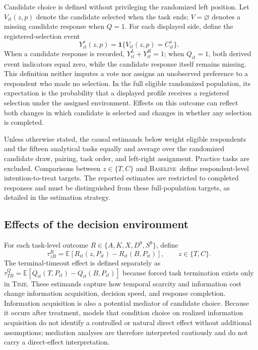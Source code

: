\documentclass[11pt]{article}\usepackage[]{graphicx}\usepackage[]{xcolor}
\newcommand{\armT}{\textsc{Time}}
\newcommand{\armB}{\textsc{Baseline}}
\newcommand{\E}{\mathbb{E}}
\begin{document}
Candidate choice is defined without privileging the randomized left position. Let $V_{it}(z,p)$ denote the candidate selected when the task ends; $V=\varnothing$ denotes a missing candidate response when $Q=1$. For each displayed side, define the registered-selection event
\[
Y^s_{it}(z,p)=\mathbf 1\{V_{it}(z,p)=C^s_{it}\}.
\]
When a candidate response is recorded, $Y^L_{it}+Y^R_{it}=1$; when $Q_{it}=1$, both derived event indicators equal zero, while the candidate response itself remains missing. This definition neither imputes a vote nor assigns an unobserved preference to a respondent who made no selection. In the full eligible randomized population, its expectation is the probability that a displayed profile receives a registered selection under the assigned environment. Effects on this outcome can reflect both changes in which candidate is selected and changes in whether any selection is completed.

Unless otherwise stated, the causal estimands below weight eligible respondents and the fifteen analytical tasks equally and average over the randomized candidate draw, pairing, task order, and left-right assignment. Practice tasks are excluded. Comparisons between $z\in\{T,C\}$ and \armB\ define respondent-level intention-to-treat targets. The reported estimates are restricted to completed responses and must be distinguished from these full-population targets, as detailed in the estimation strategy.

\subsection{Effects of the decision environment}

For each task-level outcome $R\in\{A,K,X,D^{9},S^{9}\}$, define
\[
\tau^R_{zB}=\E\!\left[R_{it}(z,P_{it})-R_{it}(B,P_{it})\right],
\qquad z\in\{T,C\}.
\]
The terminal-timeout effect is defined separately as $\tau^Q_{TB}=\E[Q_{it}(T,P_{it})-Q_{it}(B,P_{it})]$ because forced task termination exists only in \armT. These estimands capture how temporal scarcity and information cost change information acquisition, decision speed, and response completion. Information acquisition is also a potential mediator of candidate choice. Because it occurs after treatment, models that condition choice on realized information acquisition do not identify a controlled or natural direct effect without additional assumptions; mediation analyses are therefore interpreted cautiously and do not carry a direct-effect interpretation.
\end{document}
